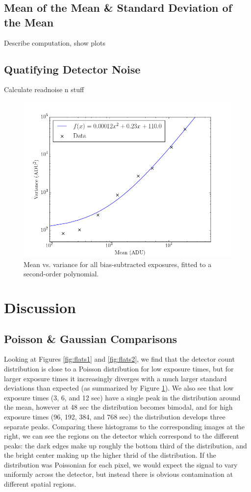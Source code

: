 \documentclass[preprint]{aastex62}
\begin{document}
\subsection{Mean of the Mean \& Standard Deviation of the Mean}
Describe computation, show plots

\subsection{Quatifying Detector Noise}
Calculate readnoise n stuff

\begin{figure}[ht]
\begin{center}
\includegraphics[width=.48\linewidth]{plots/mean_vs_variance.png}
\caption{Mean vs. variance for all bias-subtracted exposures, fitted to a second-order polynomial.} \label{fig:mean_var}
\end{center}
\end{figure}

\section{Discussion}
\subsection{Poisson \& Gaussian Comparisons} \label{subsec:dist_comparisons}
Looking at Figures \ref{fig:flats1} and \ref{fig:flats2}, we find that the detector count distribution is close to a Poisson distribution for low exposure times, but for larger exposure times it increasingly diverges with a much larger standard deviations than expected (as summarized by Figure \ref{fig:mean_var}). We also see that low exposure times (3, 6, and 12 sec) have a single peak in the distribution around the mean, however at 48 sec the distribution becomes bimodal, and for high exposure times (96, 192, 384, and 768 sec) the distribution develops three separate peaks. Comparing these histograms to the corresponding images at the right, we can see the regions on the detector which correspond to the different peaks: the dark edges make up roughly the bottom third of the distribution, and the bright center making up the higher thrid of the distribution. If the distribution was Poissonian for each pixel, we would expect the signal to vary uniformly across the detector, but instead there is obvious contamination at different spatial regions.
\end{document}
